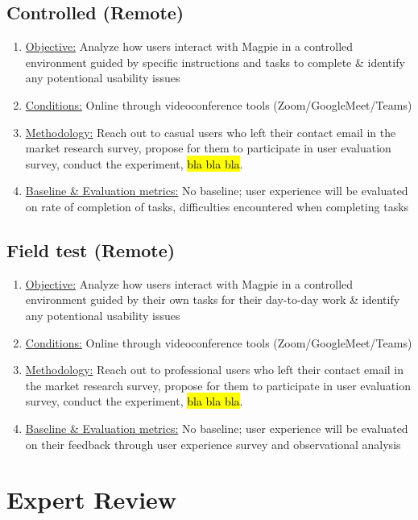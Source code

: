 \documentclass{report}
\begin{document}
\subsection{Controlled (Remote)}
\begin{enumerate}
    \item \underline{Objective:} Analyze how users interact with Magpie in a
          controlled environment guided by specific instructions and tasks to complete
          \& identify any potentional usability issues
    \item \underline{Conditions:} Online through videoconference tools
          (Zoom/GoogleMeet/Teams)
    \item \underline{Methodology:} Reach out to casual users who left their contact
          email in the market research survey, propose for them to participate in user
          evaluation survey, conduct the experiment, \hl{bla bla bla}.
    \item \underline{Baseline \& Evaluation metrics:} No baseline; user
          experience will be evaluated on rate of completion of tasks, difficulties
          encountered when completing tasks
\end{enumerate}
\subsection{Field test (Remote)}
\begin{enumerate}
    \item \underline{Objective:} Analyze how users interact with Magpie in a
          controlled environment guided by their own tasks for their day-to-day work
          \& identify any potentional usability issues
    \item \underline{Conditions:} Online through videoconference tools
          (Zoom/GoogleMeet/Teams)
    \item \underline{Methodology:} Reach out to professional users who left their contact
          email in the market research survey, propose for them to participate in user
          evaluation survey, conduct the experiment, \hl{bla bla bla}.
    \item \underline{Baseline \& Evaluation metrics:} No baseline; user
          experience will be evaluated on their feedback through user experience survey and observational analysis
\end{enumerate}
\section{Expert Review}
\end{document}
